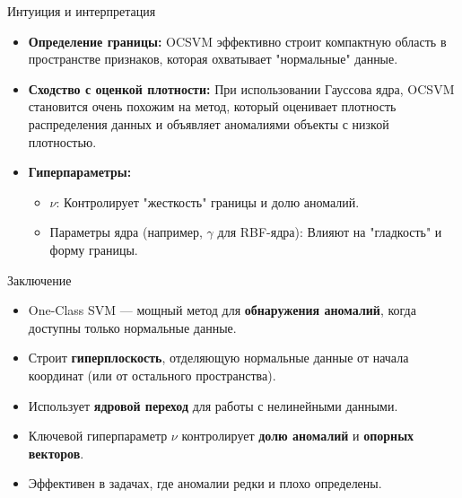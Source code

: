 \documentclass{beamer}
\begin{document}
\begin{frame}{Интуиция и интерпретация}
    \begin{itemize}
        \item \textbf{Определение границы:} OCSVM эффективно строит компактную область в пространстве признаков, которая охватывает "нормальные" данные.
        \item \textbf{Сходство с оценкой плотности:} При использовании Гауссова ядра, OCSVM становится очень похожим на метод, который оценивает плотность распределения данных и объявляет аномалиями объекты с низкой плотностью.
        \item \textbf{Гиперпараметры:}
        \begin{itemize}
            \item $\nu$: Контролирует "жесткость" границы и долю аномалий.
            \item Параметры ядра (например, $\gamma$ для RBF-ядра): Влияют на "гладкость" и форму границы.
        \end{itemize}
    \end{itemize}
\end{frame}

\begin{frame}{Заключение}
    \begin{itemize}
        \item One-Class SVM — мощный метод для \textbf{обнаружения аномалий}, когда доступны только нормальные данные.
        \item Строит \textbf{гиперплоскость}, отделяющую нормальные данные от начала координат (или от остального пространства).
        \item Использует \textbf{ядровой переход} для работы с нелинейными данными.
        \item Ключевой гиперпараметр $\nu$ контролирует \textbf{долю аномалий} и \textbf{опорных векторов}.
        \item Эффективен в задачах, где аномалии редки и плохо определены.
    \end{itemize}
\end{frame}
\end{document}
